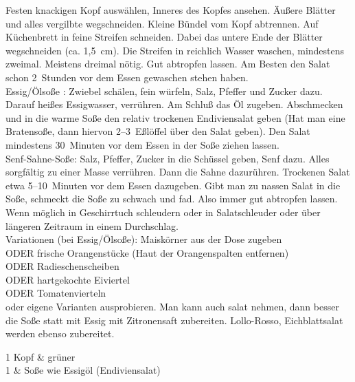       \begin{zubereitung}
        Festen knackigen Kopf auswählen, Inneres des Kopfes ansehen. Äußere
	Blätter und alles vergilbte wegschneiden. Kleine Bündel vom Kopf
	abtrennen. Auf Küchenbrett in feine Streifen schneiden. Dabei das
	untere Ende der Blätter wegschneiden (ca. 1,5~cm). Die Streifen in
	reichlich Wasser waschen, mindestens zweimal. Meistens dreimal nötig.
	Gut abtropfen lassen. Am Besten den Salat schon 2~Stunden vor dem Essen
	gewaschen stehen haben. \\
        Essig/Ölsoße : Zwiebel schälen, fein würfeln, Salz, Pfeffer und Zucker
	dazu. Darauf heißes Essigwasser, verrühren. Am Schluß das Öl zugeben.
	Abschmecken und in die warme Soße den relativ trockenen Endiviensalat
	geben (Hat man eine Bratensoße, dann hiervon 2--3~Eßlöffel über den
	Salat geben). Den Salat mindestens 30~Minuten vor dem Essen in der
	Soße ziehen lassen. \\
        Senf-Sahne-Soße: Salz, Pfeffer, Zucker in die Schüssel geben, Senf
	dazu. Alles sorgfältig zu einer Masse verrühren. Dann die Sahne
	dazurühren. Trockenen Salat etwa 5--10~Minuten vor dem Essen dazugeben.
	Gibt man zu nassen Salat in die Soße, schmeckt die Soße zu schwach und
	fad. Also immer gut abtropfen lassen. Wenn möglich in Geschirrtuch
	schleudern oder in Salatschleuder oder über längeren Zeitraum in einem
	Durchschlag. \\
        Variationen (bei Essig/Ölsoße):
        Maiskörner aus der Dose zugeben \\
        ODER    frische Orangenstücke (Haut der Orangenspalten entfernen) \\
        ODER    Radieschenscheiben \\
        ODER    hartgekochte Eiviertel \\
        ODER    Tomatenvierteln \\
        oder eigene Varianten ausprobieren. Man kann auch \frisee{}salat nehmen,
	dann besser die Soße statt mit Essig mit Zitronensaft zubereiten.
	Lollo-Rosso, Eichblattsalat werden ebenso zubereitet. \\
      \end{zubereitung}


      \begin{zutaten}
        1 Kopf & grüner  \\
        1 & Soße wie Essigöl (Endiviensalat) \\
      \end{zutaten}

